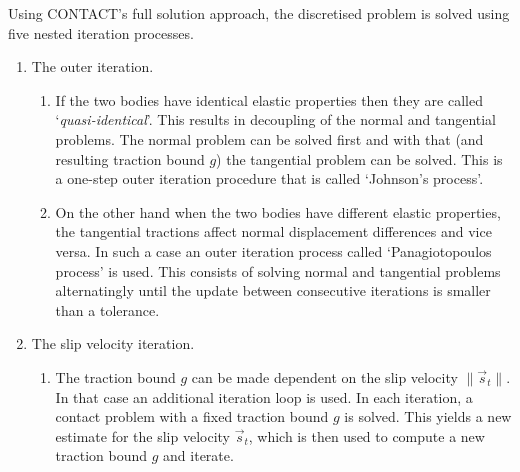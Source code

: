 \documentclass[12pt]{report}
\begin{document}
Using CONTACT's full solution approach, the discretised problem is solved
using five nested iteration processes.
\begin{enumerate}
\item The outer iteration.
\begin{enumerate}
\item If the two bodies have identical elastic properties then they are
        called `{\em quasi-identical\/}'. This results in decoupling of the
        normal and tangential problems. The normal problem can be solved
        first and with that (and resulting traction bound $g$) the
        tangential problem can be solved. This is a one-step outer
        iteration procedure that is called `Johnson's process'.

\item On the other hand when the two bodies have different elastic
        properties, the tangential tractions affect normal displacement
        differences and vice versa.
        In such a case an outer iteration process called `Panagiotopoulos
        process' is used. This consists of solving normal and tangential
        problems alternatingly until the update between consecutive
        iterations is smaller than a tolerance.
\end{enumerate}

\item\label{itm:slip_veloc} The slip velocity iteration.
\begin{enumerate}
\item The traction bound $g$ 
        can be made dependent on the slip velocity
        $\|\vec{s}_t\|$. In that case an additional iteration loop is used.
        In each iteration, a contact problem with a fixed traction bound $g$
        is solved. This yields a new estimate for the slip velocity
        $\vec{s}_t$, which is then used to compute a new traction bound $g$
        and iterate.
\end{enumerate}


\end{enumerate}
\end{document}
